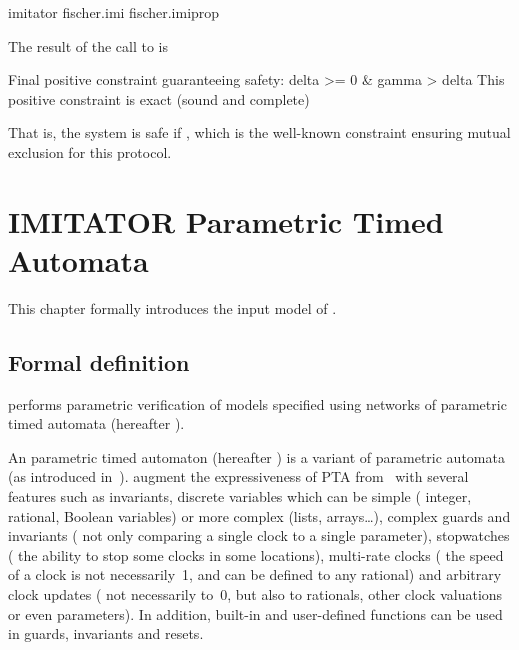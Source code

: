 \begin{terminal}
imitator fischer.imi fischer.imiprop
\end{terminal}

The result of the call to \imitator{} is

\begin{terminaloutput}
Final positive constraint guaranteeing safety:
delta >= 0
& gamma > delta
This positive constraint is exact (sound and complete)
\end{terminaloutput}

That is, the system is safe if , which is the well-known constraint ensuring mutual exclusion for this protocol.




\chapter{IMITATOR Parametric Timed Automata}\label{section:IPTA}


This chapter formally introduces the input model of \imitator{}.

\section{Formal definition}\label{section:NIPTA}

\imitator{} performs parametric verification of models specified using networks of \imitator{} parametric timed automata (hereafter \NIPTA{}).

An \imitator{} parametric timed automaton (hereafter \IPTA{}) is a variant of parametric automata (as introduced in~\cite{AHV93}).
\IPTA{} augment the expressiveness of PTA from~\cite{AHV93} with several features such as invariants, discrete variables which can be simple (\eg{} integer, rational, Boolean variables) or more complex (lists, arrays…), complex guards and invariants (\ie{} not only comparing a single clock to a single parameter), stopwatches (\ie{} the ability to stop some clocks in some locations), multi-rate clocks (\ie{} the speed of a clock is not necessarily~1, and can be defined to any rational) and arbitrary clock updates (\ie{} not necessarily to~0, but also to rationals, other clock valuations or even parameters).
In addition, built-in and user-defined functions can be used in guards, invariants and resets.


